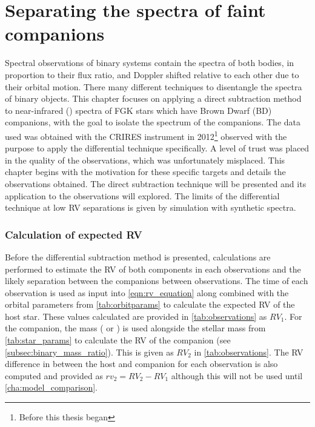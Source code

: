 
\chapter{Separating the spectra of faint companions} %
\label{cha:direct_recovery}

Spectral observations of binary systems contain the spectra of both bodies, in proportion to their flux ratio, and Doppler shifted relative to each other due to their orbital motion.
There many different techniques to disentangle the spectra of binary objects.
This chapter focuses on applying a direct subtraction method to near-infrared (\nir{}) spectra of {FGK} stars which have Brown Dwarf (BD) companions, with the goal to isolate the spectrum of the companions.
The data used was obtained with the {CRIRES} instrument in 2012\footnote{Before this thesis began} observed with the purpose to apply the differential technique specifically.
A level of trust was placed in the quality of the observations, which was unfortunately misplaced.
This chapter begins with the motivation for these specific targets and details the observations obtained.
The direct subtraction technique will be presented and its application to the observations will explored.
The limits of the differential technique at low {RV} separations is given by simulation with synthetic spectra.














\subsection{Calculation of expected {RV}}

Before the differential subtraction method is presented, calculations are performed to estimate the {RV} of both components in each observations and the likely separation between the companions between observations.
The time of each observation is used as input into \cref{eqn:rv_equation} along combined with the orbital parameters from \cref{tab:orbitparams} to calculate the expected {RV} of the host star.
These values calculated are provided in \cref{tab:observations} as \({RV}_{1}\).
For the companion, the mass (\Mtwo{} or \Mtwosini{}) is used alongside the stellar mass from \cref{tab:star_params} to calculate the {RV} of the companion (see \cref{subsec:binary_mass_ratio}).
This is given as \({RV}_{2}\) in \cref{tab:observations}.
The {RV} difference in between the host and companion for each observation is also computed and provided as \({rv}_{2} = {RV}_{2}-{RV}_{1}\) although this will not be used until \cref{cha:model_comparison}.

